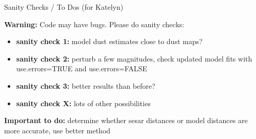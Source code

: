 \documentclass[12pt]{beamer}
\begin{document}
\begin{frame}{Sanity Checks / To Dos (for Katelyn)}

\textbf{Warning:} Code may have bugs. Please do sanity checks:
  
  \begin{itemize}
  \item \textbf{sanity check 1:} model dust estimates close to dust maps?
  \item \textbf{sanity check 2:} perturb a few magnitudes, check updated model fits with use.errors=TRUE and use.errors=FALSE
  \item \textbf{sanity check 3:} better results than before?
  \item \textbf{sanity check X:} lots of other possibilities
  \end{itemize}

\vspace{.2in}
  
\textbf{Important to do:} determine whether sesar distances or model distances are more accurate, use better method
\end{frame}
\end{document}
